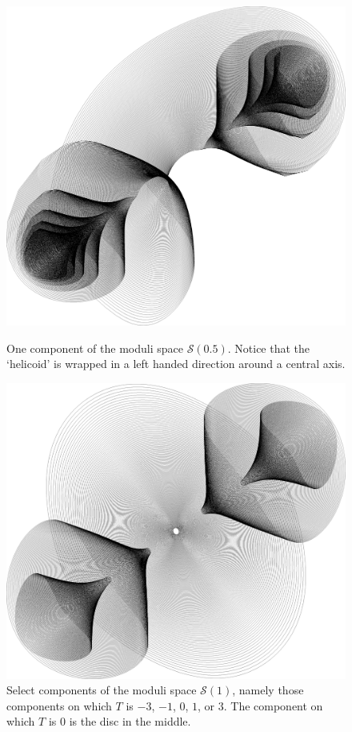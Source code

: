 \documentclass{article}
\begin{document}
\begin{figure}[p]
    \centering
    \includegraphics[height=0.5\textheight]{graphics/moduli_plot_p05.png}
    \caption{One component of the moduli space $\mathcal{S}(0.5)$. Notice that the `helicoid' is wrapped in a left handed direction around a central axis.\label{fig:p05 plot}}

    \vspace*{\floatsep}

    \includegraphics[height=0.4\textheight]{graphics/moduli_plot_p1.png}
    \caption{Select components of the moduli space $\mathcal{S}(1)$, namely those components on which $T$ is $-3$, $-1$, $0$, $1$, or $3$. The component on which $T$ is $0$ is the disc in the middle.\label{fig:p1 plot}}
\end{figure}
\end{document}
